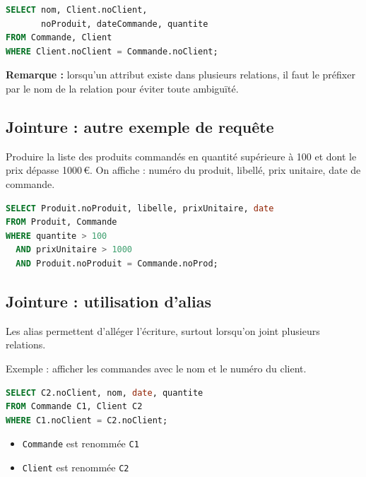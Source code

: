 \begin{sqlcodebox}
\begin{lstlisting}[language=SQL]
SELECT nom, Client.noClient,
       noProduit, dateCommande, quantite
FROM Commande, Client
WHERE Client.noClient = Commande.noClient;
\end{lstlisting}
\end{sqlcodebox}

\textbf{Remarque :} lorsqu’un attribut existe dans plusieurs relations, il faut le préfixer par le nom de la relation pour éviter toute ambiguïté.


\subsection{Jointure : autre exemple de requête}

Produire la liste des produits commandés en quantité supérieure à 100 et dont le prix dépasse 1000\,€.  
On affiche : numéro du produit, libellé, prix unitaire, date de commande.

\begin{sqlcodebox}
\begin{lstlisting}[language=SQL]
SELECT Produit.noProduit, libelle, prixUnitaire, date
FROM Produit, Commande
WHERE quantite > 100
  AND prixUnitaire > 1000
  AND Produit.noProduit = Commande.noProd;
\end{lstlisting}
\end{sqlcodebox}

\subsection{Jointure : utilisation d’alias}

Les alias permettent d’alléger l’écriture, surtout lorsqu’on joint plusieurs relations.

Exemple : afficher les commandes avec le nom et le numéro du client.

\begin{sqlcodebox}
\begin{lstlisting}[language=SQL]
SELECT C2.noClient, nom, date, quantite
FROM Commande C1, Client C2
WHERE C1.noClient = C2.noClient;
\end{lstlisting}
\end{sqlcodebox}

\begin{itemize}
    \item \texttt{Commande} est renommée \texttt{C1}
    \item \texttt{Client} est renommée \texttt{C2}
\end{itemize}


